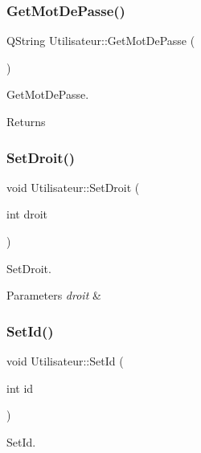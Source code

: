 \subsubsection{\texorpdfstring{Get\+Mot\+De\+Passe()}{GetMotDePasse()}}
{\footnotesize\ttfamily Q\+String Utilisateur\+::\+Get\+Mot\+De\+Passe (\begin{DoxyParamCaption}{ }\end{DoxyParamCaption})}



Get\+Mot\+De\+Passe. 

\begin{DoxyReturn}{Returns}

\end{DoxyReturn}
\mbox{\label{class_utilisateur_ab1d22e4a620262b9ea352b53872d855c}} 
\subsubsection{\texorpdfstring{Set\+Droit()}{SetDroit()}}
{\footnotesize\ttfamily void Utilisateur\+::\+Set\+Droit (\begin{DoxyParamCaption}\item[{int}]{droit }\end{DoxyParamCaption})}



Set\+Droit. 


\begin{DoxyParams}{Parameters}
{\em droit} & \\
\hline
\end{DoxyParams}
\mbox{\label{class_utilisateur_a583802b49a289114a47911a4ac98158d}} 
\subsubsection{\texorpdfstring{Set\+Id()}{SetId()}}
{\footnotesize\ttfamily void Utilisateur\+::\+Set\+Id (\begin{DoxyParamCaption}\item[{int}]{id }\end{DoxyParamCaption})}



Set\+Id. 


